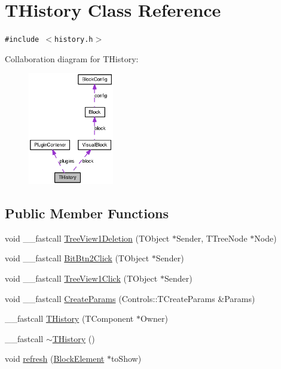 \hypertarget{classTHistory}{
\section{THistory Class Reference}
\label{classTHistory}
}
{\tt \#include $<$history.h$>$}

Collaboration diagram for THistory:\nopagebreak
\begin{figure}[H]
\begin{center}
\leavevmode
\includegraphics[width=106pt]{classTHistory__coll__graph}
\end{center}
\end{figure}
\subsection*{Public Member Functions}
\begin{CompactItemize}
\item 
void \_\-\_\-fastcall \hyperlink{classTHistory_a54230b362227ac394e19e47471c6ae4}{TreeView1Deletion} (TObject $\ast$Sender, TTreeNode $\ast$Node)
\item 
void \_\-\_\-fastcall \hyperlink{classTHistory_8f2cc8301b158c9845720077b2992b93}{BitBtn2Click} (TObject $\ast$Sender)
\item 
void \_\-\_\-fastcall \hyperlink{classTHistory_4abbf05ae8c7d566b30a7ed0f87fefdf}{TreeView1Click} (TObject $\ast$Sender)
\item 
void \_\-\_\-fastcall \hyperlink{classTHistory_80ff4787a2ecce89533f1fb22cb3c9b6}{CreateParams} (Controls::TCreateParams \&Params)
\item 
\_\-\_\-fastcall \hyperlink{classTHistory_a63049b9a1cc855fc3398c8471e1ca6e}{THistory} (TComponent $\ast$Owner)
\item 
\_\-\_\-fastcall \hyperlink{classTHistory_1aea950a4179841c02848a2f578b6545}{$\sim$THistory} ()
\item 
void \hyperlink{classTHistory_a4c0599263631652e37b50d557269974}{refresh} (\hyperlink{classBlockElement}{BlockElement} $\ast$toShow)
\end{CompactItemize}
